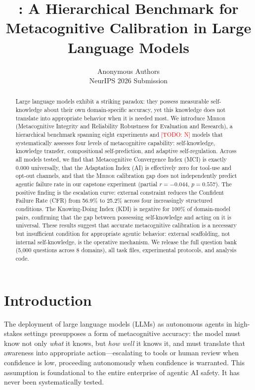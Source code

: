 \documentclass[10pt]{article}
\title{\mirror: A Hierarchical Benchmark for Metacognitive Calibration in Large Language Models}
\author{
  Anonymous Authors \\
  NeurIPS 2026 Submission
}
\date{}
\newcommand{\todo}[1]{\textcolor{red}{[TODO: #1]}}
\newcommand{\mirror}{\textsc{Mirror}}
\newcommand{\MCI}{MCI}
\newcommand{\KDI}{KDI}
\newcommand{\CFR}{CFR}
\newcommand{\AI}{AI}
\begin{document}
\maketitle

\begin{abstract}
Large language models exhibit a striking paradox: they possess measurable self-knowledge
about their own domain-specific accuracy, yet this knowledge does not translate into
appropriate behavior when it is needed most. We introduce \mirror{}
(Metacognitive Integrity and Reliability Robustness for Evaluation and Research), a
hierarchical benchmark spanning eight experiments and \todo{N} models that systematically
assesses four levels of metacognitive capability: self-knowledge, knowledge transfer,
compositional self-prediction, and adaptive self-regulation. Across all models tested, we
find that Metacognitive Convergence Index (\MCI) is exactly 0.000 universally, that the
Adaptation Index (\AI) is effectively zero for tool-use and opt-out channels, and that
the \mirror{} calibration gap does not independently predict agentic failure rate in our
capstone experiment (partial $r = -0.044$, $p = 0.557$). The positive finding is
the escalation curve: external constraint reduces the Confident Failure Rate (\CFR) from
56.9\% to 25.2\% across four increasingly structured conditions. The Knowing-Doing Index
(\KDI) is negative for 100\% of domain-model pairs, confirming that the gap between
possessing self-knowledge and acting on it is universal. These results suggest that
accurate metacognitive calibration is a necessary but insufficient condition for
appropriate agentic behavior: external scaffolding, not internal self-knowledge,
is the operative mechanism. We release the full question bank (5,000 questions across
8 domains), all task files, experimental protocols, and analysis code.
\end{abstract}

\section{Introduction}
\label{sec:intro}

The deployment of large language models (LLMs) as autonomous agents in high-stakes
settings presupposes a form of metacognitive accuracy: the model must know not only
\textit{what} it knows, but \textit{how well} it knows it, and must translate that
awareness into appropriate action---escalating to tools or human review when confidence
is low, proceeding autonomously when confidence is warranted. This assumption is
foundational to the entire enterprise of agentic AI safety. It has never been
systematically tested.
\end{document}

